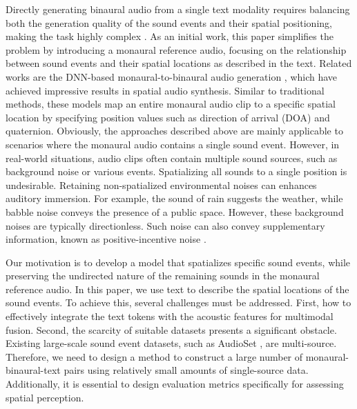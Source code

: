 \documentclass{IEEEtran}
\begin{document}
Directly generating binaural audio from a single text modality requires balancing both the generation quality of the sound events and their spatial positioning, making the task highly complex \cite{choi2022proposal}. As an initial work, this paper simplifies the problem by introducing a monaural reference audio, focusing on the relationship between sound events and their spatial locations as described in the text. Related works are the DNN-based monaural-to-binaural audio generation \cite{richard2021neural, leng2022binauralgrad}, which have achieved impressive results in spatial audio synthesis. Similar to traditional methods, these models map an entire monaural audio clip to a specific spatial location by specifying position values such as direction of arrival (DOA) and quaternion. Obviously, the approaches described above are mainly applicable to scenarios where the monaural audio contains a single sound event. However, in real-world situations, audio clips often contain multiple sound sources, such as background noise or various events. Spatializing all sounds to a single position is undesirable. Retaining non-spatialized environmental noises can enhances auditory immersion. For example, the sound of rain suggests the weather, while babble noise conveys the presence of a public space. However, these background noises are typically directionless. Such noise can also convey supplementary information, known as positive-incentive noise \cite{li2022positive}.

Our motivation is to develop a model that spatializes specific sound events, while preserving the undirected nature of the remaining sounds in the monaural reference audio. In this paper, we use text to describe the spatial locations of the sound events. To achieve this, several challenges must be addressed. First, how to effectively integrate the text tokens with the acoustic features for multimodal fusion. Second, the scarcity of suitable datasets presents a significant obstacle. Existing large-scale sound event datasets, such as AudioSet \cite{gemmeke2017audio}, are multi-source. Therefore, we need to design a method to construct a large number of monaural-binaural-text pairs using relatively small amounts of single-source data. Additionally, it is essential to design evaluation metrics specifically for assessing spatial perception.
\end{document}

